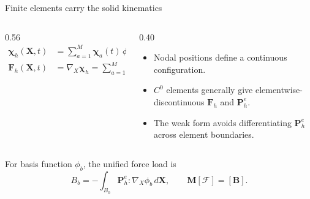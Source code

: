 \documentclass[aspectratio=169,11pt]{beamer}
\newcommand{\Xvec}{\bm{X}}
\newcommand{\Ften}{\bm{F}}
\newcommand{\Pten}{\bm{P}^{e}}
\newcommand{\lforce}{\bm{\mathcal{F}}}
\begin{document}
\begin{frame}{Finite elements carry the solid kinematics}
\begin{columns}[c,onlytextwidth]
\begin{column}{0.56\textwidth}
\begin{align*}
\bm{\chi}_h(\Xvec,t)
  &=\sum_{a=1}^{M}\bm{\chi}_a(t)\,\phi_a(\Xvec),\\[3pt]
\Ften_h(\Xvec,t)
  &=\nabla_{\!X}\bm{\chi}_h
   =\sum_{a=1}^{M}\bm{\chi}_a(t)\otimes\nabla_{\!X}\phi_a.
\end{align*}
\end{column}
\begin{column}{0.40\textwidth}
\begin{itemize}\itemsep7pt
  \item Nodal positions define a continuous configuration.
  \item \(C^0\) elements generally give elementwise-discontinuous \(\Ften_h\) and \(\Pten_h\).
  \item The weak form avoids differentiating \(\Pten_h\) across element boundaries.
\end{itemize}
\end{column}
\end{columns}

\medskip
For basis function \(\phi_b\), the unified force load is
\[
B_b=-\int_{B_0}\Pten_h:\nabla_{\!X}\phi_b\,d\Xvec,
\qquad \bm{M}[\lforce]=[\bm{B}].
\]
\end{frame}
\end{document}
